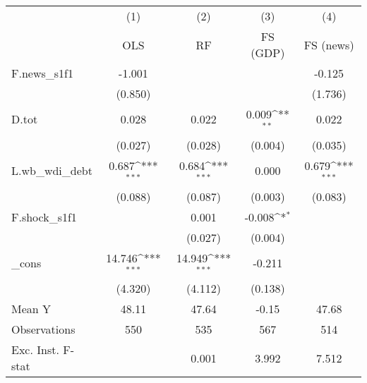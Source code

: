 {
\def\sym#1{\ifmmode^{#1}\else\(^{#1}\)\fi}
\begin{tabular}{l*{4}{c}}
\toprule
            &\multicolumn{1}{c}{(1)}&\multicolumn{1}{c}{(2)}&\multicolumn{1}{c}{(3)}&\multicolumn{1}{c}{(4)}\\
            &\multicolumn{1}{c}{OLS}&\multicolumn{1}{c}{RF}&\multicolumn{1}{c}{FS (GDP)}&\multicolumn{1}{c}{FS (news)}\\
\midrule
F.news\_s1f1 &      -1.001         &                     &                     &      -0.125         \\
            &     (0.850)         &                     &                     &     (1.736)         \\
\addlinespace
D.tot       &       0.028         &       0.022         &       0.009\sym{**} &       0.022         \\
            &     (0.027)         &     (0.028)         &     (0.004)         &     (0.035)         \\
\addlinespace
L.wb\_wdi\_debt&       0.687\sym{***}&       0.684\sym{***}&       0.000         &       0.679\sym{***}\\
            &     (0.088)         &     (0.087)         &     (0.003)         &     (0.083)         \\
\addlinespace
F.shock\_s1f1&                     &       0.001         &      -0.008\sym{*}  &                     \\
            &                     &     (0.027)         &     (0.004)         &                     \\
\addlinespace
\_cons      &      14.746\sym{***}&      14.949\sym{***}&      -0.211         &                     \\
            &     (4.320)         &     (4.112)         &     (0.138)         &                     \\
\midrule
Mean Y      &       48.11         &       47.64         &       -0.15         &       47.68         \\
Observations&         550         &         535         &         567         &         514         \\
Exc. Inst. F-stat&                     &       0.001         &       3.992         &       7.512         \\
\bottomrule
\end{tabular}
}
